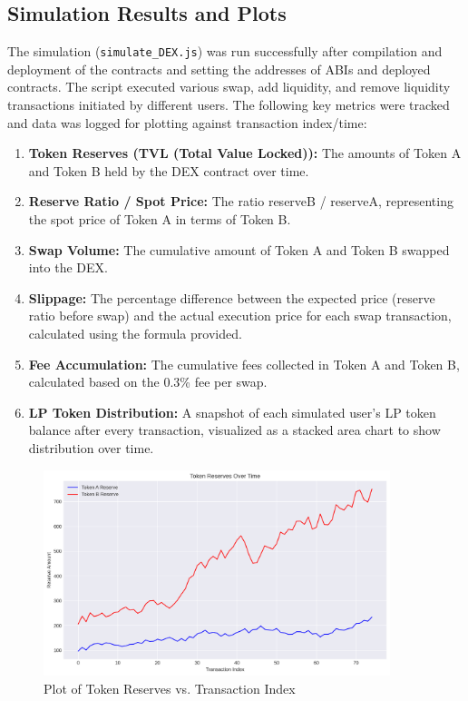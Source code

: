 \documentclass[12pt]{article}
\begin{document}
\subsection{Simulation Results and Plots}
The simulation (\texttt{simulate\_DEX.js}) was run successfully after compilation and deployment of the contracts and setting the addresses of ABIs and deployed contracts. The script executed various swap, add liquidity, and remove liquidity transactions initiated by different users.
The following key metrics were tracked and data was logged for plotting against transaction index/time:
\begin{enumerate}
    \item \textbf{Token Reserves (TVL (Total Value Locked)):} The amounts of Token A and Token B held by the DEX contract over time.
    \item \textbf{Reserve Ratio / Spot Price:} The ratio reserveB / reserveA, representing the spot price of Token A in terms of Token B.
    \item \textbf{Swap Volume:} The cumulative amount of Token A and Token B swapped into the DEX.
    \item \textbf{Slippage:} The percentage difference between the expected price (reserve ratio before swap) and the actual execution price for each swap transaction, calculated using the formula provided.
    \item \textbf{Fee Accumulation:} The cumulative fees collected in Token A and Token B, calculated based on the 0.3\% fee per swap.
    \item \textbf{LP Token Distribution:} A snapshot of each simulated user's LP token balance after every transaction, visualized as a stacked area chart to show distribution over time.
\end{enumerate}
\begin{figure}[H]
    \centering
    \includegraphics[width=0.9\textwidth]{../task2_plots/reserves.png}
    \caption{Plot of Token Reserves vs. Transaction Index}
    \label{fig:reserves}
\end{figure}
\end{document}
